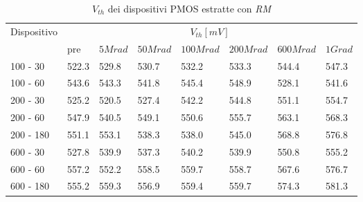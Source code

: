 \documentclass[12pt, letterpaper]{book}
\begin{document}
\begin{table}[H]
  \renewcommand{\arraystretch}{1.3}
    \begin{tabular}{m{2cm} m{0.8cm} m{1.1cm} m{1.3cm} m{1.5cm} m{1.5cm} m{1.5cm} m{1cm}}
      \toprule
      \multirow{2}{*}{Dispositivo} & \multicolumn{7}{c}{$V_{th} [mV] $}                                                                    \\
      \cmidrule{2-8}
                                   	& pre  			& $5Mrad$ & $50Mrad$ & $100Mrad$ & $200Mrad$ & $600Mrad$ & $1Grad$ \\
      \midrule
      100 - 30                 	& 522.3     		& 529.8		& 530.7    	& 532.2 		&  533.3    	& 544.4     	& 547.3   \\
      \hline
      100 - 60                  	& 543.6            	& 543.3    	& 541.8   	& 545.4  	& 548.9     	& 528.1     	& 541.6   \\
      \hline
      200 - 30 			& 525.2          	& 520.5   	& 527.4  	& 542.2   	& 544.8     	& 551.1   	& 554.7   \\
      \hline
      200 - 60                  	&547.9			& 540.5 		& 549.1    	& 550.6   	& 555.7   	& 563.1    	& 568.3   \\
      \hline
      200 - 180                 	& 551.1      		& 553.1    	& 538.3  	&538.0     	& 545.0    	& 568.8    	& 576.8   \\
      \hline
      600 - 30               	& 527.8           	& 539.9		& 537.3   	& 540.2     	& 539.9     	& 550.8   	& 555.2    \\
      \hline
      600 - 60              	& 557.2           	& 552.2   	& 558.5   	& 559.7      	& 558.7    	& 567.6      	& 576.7   \\
      \hline
      600 - 180                	& 555.2            	& 559.3    	& 556.9    	& 559.4     	& 559.7     	& 574.3       	& 581.3   \\
      \bottomrule
    \end{tabular}
  \caption{$V_{th}$ dei dispositivi PMOS estratte con \emph{RM}}
  \label{tab:VthRMP}
\end{table}
\end{document}

